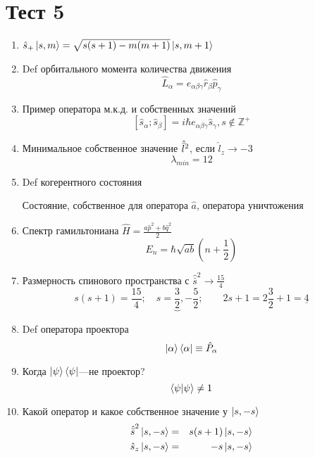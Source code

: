 \section*{Тест 5}
\begin{enumerate}
    \item $\Hat s_+ \ket{s,m} = \sqrt{s(s+1)-m(m+1)}\ket{s,m+1}$
    \item Def орбитального момента количества движения
        $$\hat L_\alpha = e_{\alpha\beta\gamma}\hat r_\beta \hat 
p_\gamma$$
    \item Пример оператора м.к.д. и собственных значений
$$[\hat s_\alpha;\hat s_\beta] = i\hbar e_{\alpha\beta\gamma}\hat 
s_\gamma, s\not \in \mathbb Z^+$$
    \item Минимальное собственное значение $\Hat{\bar l}^2$, если $\hat 
l_z \to -3$
$$\lambda_{min}=12$$
    \item Def когерентного состояния

        Состояние, собственное для оператора $\hat a$, оператора уничтожения
    \item Спектр гамильтониана $\hat H=\frac{a{\hat p}^2+b{\hat q}^2}{2}$
        $$E_n = \hbar\sqrt{ab}\left(n+\frac{1}{2}\right)$$
    \item Размерность спинового пространства с $\hat{\bar s}^2\to \frac{15}{4}$
        $$s(s+1)=\frac{15}{4};\quad s=\underbrace{\frac{3}{2}},-\frac{5}{2}; \qquad 2s+1=2\frac{3}{2}+1=\underline{4}$$
    \item Def оператора проектора
        $$\ket{\alpha}\bra{\alpha}\equiv \hat P_\alpha$$
   \item Когда $\ket{\psi}\bra{\psi}$---не проектор?
       $$\braket{\psi|\psi}\neq 1$$
   \item Какой оператор и какое собственное значение у $\ket{s,-s}$
       \begin{eqnarray}
           {\Hat{\bar s}}^2\ket{s,-s}&=&s(s+1)\ket{s,-s}\\
           \hat s_z\ket{s,-s}&=&-s\ket{s,-s}
       \end{eqnarray}
\end{enumerate}
